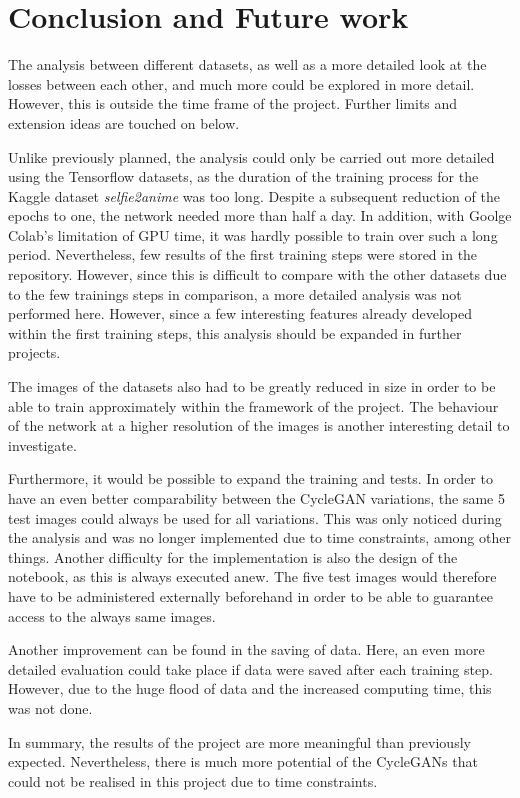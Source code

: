 \documentclass[fleqn,10pt]{SelfArx} %
\begin{document}
\section{Conclusion and Future work}
The analysis between different datasets, as well as a more detailed look at the losses between each other, and much more could be explored in more detail. However, this is outside the time frame of the project. Further limits and extension ideas are touched on below.

Unlike previously planned, the analysis could only be carried out more detailed using the Tensorflow datasets, as the duration of the training process for the Kaggle dataset \textit{selfie2anime} was too long. Despite a subsequent reduction of the epochs to one, the network needed more than half a day. In addition, with Goolge Colab's limitation of GPU time, it was hardly possible to train over such a long period. Nevertheless, few results of the first training steps were stored in the repository. However, since this is difficult to compare with the other datasets due to the few trainings steps in comparison, a more detailed analysis was not performed here. However, since a few interesting features already developed within the first training steps, this analysis should be expanded in further projects.

The images of the datasets also had to be greatly reduced in size in order to be able to train approximately within the framework of the project. The behaviour of the network at a higher resolution of the images is another interesting detail to investigate.

Furthermore, it would be possible to expand the training and tests. In order to have an even better comparability between the Cycle\ac{GAN} variations, the same 5 test images could always be used for all variations. This was only noticed during the analysis and was no longer implemented due to time constraints, among other things. Another difficulty for the implementation is also the design of the notebook, as this is always executed anew. The five test images would therefore have to be administered externally beforehand in order to be able to guarantee access to the always same images.

Another improvement can be found in the saving of data. Here, an even more detailed evaluation could take place if data were saved after each training step. However, due to the huge flood of data and the increased computing time, this was not done.

In summary, the results of the project are more meaningful than previously expected. Nevertheless, there is much more potential of the Cycle\ac{GAN}s that could not be realised in this project due to time constraints.
\end{document}
